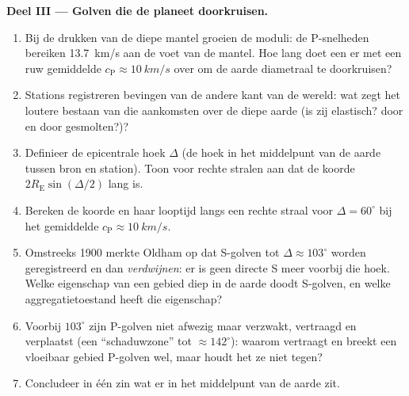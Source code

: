 \begin{problem}
\medskip\noindent\textbf{Deel III --- Golven die de planeet doorkruisen.}
\begin{enumerate}[resume]
  \item Bij de drukken van de diepe mantel groeien de moduli: de
        P-snelheden bereiken \qty{13.7}{km/s} aan de voet van de
        mantel. Hoe lang doet een  er met een ruw gemiddelde
        $c_{\text{P}} \approx \qty{10}{km/s}$ over om de aarde
        diametraal te doorkruisen?
  \item Stations registreren bevingen van de andere kant van de wereld:
        wat zegt het loutere bestaan van die aankomsten over de diepe
        aarde (is zij elastisch? door en door gesmolten?)?
  \item Definieer de epicentrale hoek $\Delta$ (de hoek in het
        middelpunt van de aarde tussen bron en station). Toon voor
        rechte stralen aan dat de koorde $2R_{\text{E}}\sin(\Delta/2)$
        lang is.
  \item Bereken de koorde en haar looptijd langs een rechte straal voor
        $\Delta = 60^\circ$ bij het gemiddelde $c_{\text{P}} \approx
        \qty{10}{km/s}$.
  \item Omstreeks 1900 merkte Oldham op dat S-golven tot $\Delta \approx 103^\circ$ worden geregistreerd en dan
        \emph{verdwijnen}: er is geen directe S meer voorbij die hoek.
        Welke eigenschap van een gebied diep in de aarde doodt
        S-golven, en welke aggregatietoestand heeft die eigenschap?
  \item Voorbij $103^\circ$ zijn P-golven niet afwezig maar verzwakt,
        vertraagd en verplaatst (een ``schaduwzone'' tot
        $\approx 142^\circ$): waarom vertraagt en breekt een vloeibaar gebied
        P-golven wel, maar houdt het ze niet tegen?
  \item Concludeer in één zin wat er in het middelpunt van de aarde
        zit.
\end{enumerate}


\end{problem}
